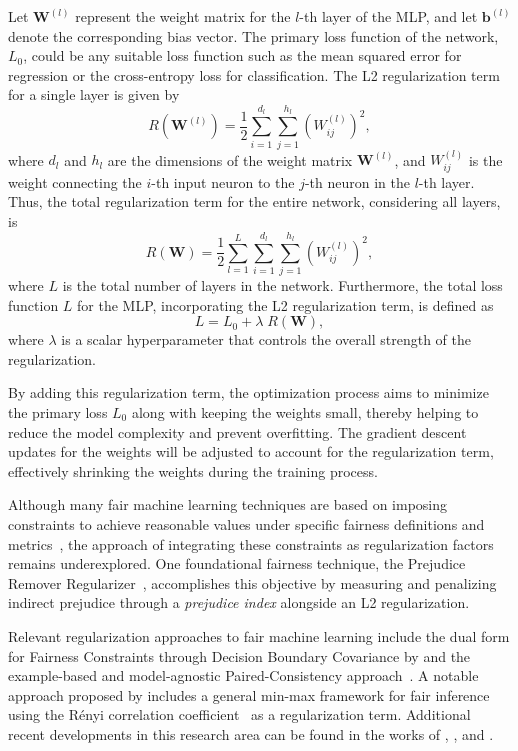 Let $\mathbf{W}^{(l)}$ represent the weight matrix for the $l$-th layer of the MLP, and let $\mathbf{b}^{(l)}$ denote the corresponding bias vector. The primary loss function of the network, $L_0$, could be any suitable loss function such as the mean squared error for regression or the cross-entropy loss for classification. The L2 regularization term for a single layer is given by
\begin{equation}
R(\mathbf{W}^{(l)}) = \frac{1}{2} \sum_{i=1}^{d_l} \sum_{j=1}^{h_l} \left( W^{(l)}_{ij} \right)^2,
\end{equation}
where $d_l$ and $h_l$ are the dimensions of the weight matrix $\mathbf{W}^{(l)}$, and $W^{(l)}_{ij}$ is the weight connecting the $i$-th input neuron to the $j$-th neuron in the $l$-th layer. Thus, the total regularization term for the entire network, considering all layers, is
\begin{equation}
R(\mathbf{W}) = \frac{1}{2} \sum_{l=1}^{L} \sum_{i=1}^{d_l} \sum_{j=1}^{h_l} \left( W^{(l)}_{ij} \right)^2,
\end{equation}
where $L$ is the total number of layers in the network. Furthermore, the total loss function $L$ for the MLP, incorporating the L2 regularization term, is defined as
\begin{equation}
L = L_0 + \lambda \; R(\mathbf{W}),
\end{equation}
where $\lambda$ is a scalar hyperparameter that controls the overall strength of the regularization.

By adding this regularization term, the optimization process aims to minimize the primary loss $L_0$ along with keeping the weights small, thereby helping to reduce the model complexity and prevent overfitting. The gradient descent updates for the weights will be adjusted to account for the regularization term, effectively shrinking the weights during the training process.

Although many fair machine learning techniques are based on imposing constraints to achieve reasonable values under specific fairness definitions and metrics~\citep{Mehrabi2019,caton2023,Hort2023}, the approach of integrating these constraints as regularization factors remains underexplored. One foundational fairness technique, the Prejudice Remover Regularizer~\citep{Kamishima2012}, accomplishes this objective by measuring and penalizing indirect prejudice through a \textit{prejudice index} alongside an L2 regularization.

Relevant regularization approaches to fair machine learning include the dual form for Fairness Constraints through Decision Boundary Covariance by \cite{Zafar2017b} and the example-based and model-agnostic Paired-Consistency approach~\citep{Horesh2020}. A notable approach proposed by \cite{Baharlouei2020} includes a general min-max framework for fair inference using the Rényi correlation coefficient~\citep{Renyi1959} as a regularization term. Additional recent developments in this research area can be found in the works of \cite{Olfat2020}, \cite{Yu2022}, and \cite{jung2023}.

